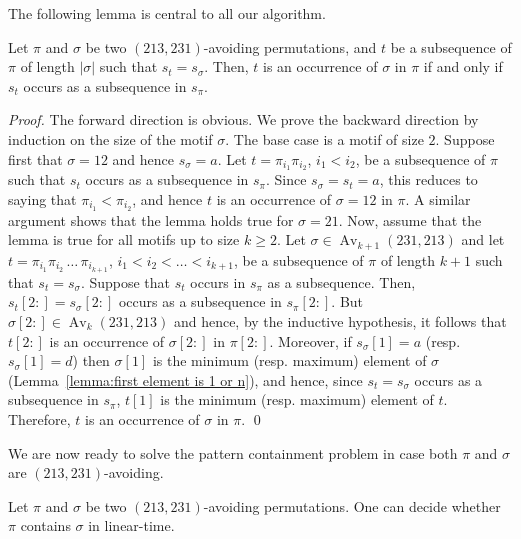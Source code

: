 \documentclass[a4paper]{llncs}
\DeclareMathOperator{\Avd}{Av}
\newcommand\Av[2]{\Avd_{{#1}}({#2})}
\begin{document}
The following lemma is central to all our algorithm.

\begin{lemma}
\label{lemma:MatchStripeToPermutation}
Let $\pi$ and $\sigma$ be two $(213,231)$-avoiding permutations,
and $t$ be a subsequence of $\pi$ of length $|\sigma|$ such that $s_t = s_\sigma$.
Then, $t$ is an occurrence of $\sigma$ in $\pi$ if and only if
$s_t$ occurs as a subsequence in $s_\pi$.
\end{lemma}

\begin{proof}
  The forward direction is obvious.
  We prove the backward direction by induction on the size of the motif
  $\sigma$.
  The base case is a motif of size $2$.
  Suppose first that $\sigma = 12$ and hence $s_\sigma = a$.
  Let $t = \pi_{i_1}\pi_{i_2}$, $i_1 < i_2$, be a subsequence of $\pi$
  such that $s_t$ occurs as a subsequence in $s_\pi$.
  Since $s_\sigma = s_t = a$, this reduces to saying that
  $\pi_{i_1} < \pi_{i_2}$, and hence $t$ is an occurrence of $\sigma = 12$ in $\pi$.
  A similar argument shows that the lemma holds true for $\sigma = 21$.
  Now, assume that the lemma is true for all motifs up to size $k \geq 2$.
  Let $\sigma \in \Av{k+1}{231,213}$ and
  let $t = \pi_{i_1}\pi_{i_2}\,\ldots\,\pi_{i_{k+1}}$,
  $i_1 < i_2 < \ldots < i_{k+1}$,
  be a subsequence of $\pi$ of length $k+1$ such that
  $s_t = s_\sigma$.
  Suppose that $s_t$ occurs in $s_\pi$ as a subsequence.
  Then, $s_t[2:] = s_\sigma[2:]$ occurs as a subsequence in $s_\pi[2:]$.
  But $\sigma[2:] \in \Av{k}{231,213}$ and hence,
  by the inductive hypothesis, it follows that
  $t[2:]$ is an occurrence of $\sigma[2:]$ in $\pi[2:]$.
  Moreover, if $s_\sigma[1] = a$ (resp. $s_\sigma[1] = d$)
  then $\sigma[1]$ is the minimum (resp. maximum) element of $\sigma$
  (Lemma~\ref{lemma:first element is 1 or n}),
  and hence, since $s_t = s_\sigma$ occurs as a subsequence in $s_\pi$,
  $t[1]$ is the minimum (resp. maximum) element of $t$.
  Therefore, $t$ is an occurrence of $\sigma$ in $\pi$.
\qed
\end{proof}

We are now ready to solve the pattern containment problem in case
both $\pi$ and $\sigma$ are $(213, 231)$-avoiding.

\begin{proposition}
	Let $\pi$ and $\sigma$ be two $(213,231)$-avoiding permutations.
	One can decide whether $\pi$ contains $\sigma$ in linear-time.
\end{proposition}
\end{document}

